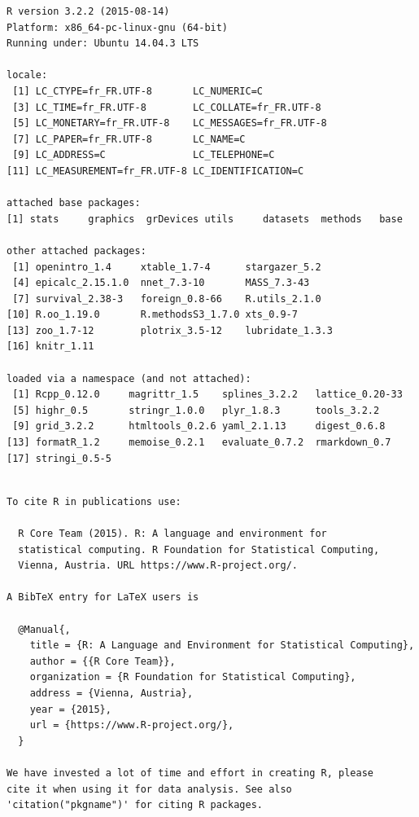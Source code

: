 \documentclass[]{article}
\begin{document}
\begin{verbatim}
R version 3.2.2 (2015-08-14)
Platform: x86_64-pc-linux-gnu (64-bit)
Running under: Ubuntu 14.04.3 LTS

locale:
 [1] LC_CTYPE=fr_FR.UTF-8       LC_NUMERIC=C              
 [3] LC_TIME=fr_FR.UTF-8        LC_COLLATE=fr_FR.UTF-8    
 [5] LC_MONETARY=fr_FR.UTF-8    LC_MESSAGES=fr_FR.UTF-8   
 [7] LC_PAPER=fr_FR.UTF-8       LC_NAME=C                 
 [9] LC_ADDRESS=C               LC_TELEPHONE=C            
[11] LC_MEASUREMENT=fr_FR.UTF-8 LC_IDENTIFICATION=C       

attached base packages:
[1] stats     graphics  grDevices utils     datasets  methods   base     

other attached packages:
 [1] openintro_1.4     xtable_1.7-4      stargazer_5.2    
 [4] epicalc_2.15.1.0  nnet_7.3-10       MASS_7.3-43      
 [7] survival_2.38-3   foreign_0.8-66    R.utils_2.1.0    
[10] R.oo_1.19.0       R.methodsS3_1.7.0 xts_0.9-7        
[13] zoo_1.7-12        plotrix_3.5-12    lubridate_1.3.3  
[16] knitr_1.11       

loaded via a namespace (and not attached):
 [1] Rcpp_0.12.0     magrittr_1.5    splines_3.2.2   lattice_0.20-33
 [5] highr_0.5       stringr_1.0.0   plyr_1.8.3      tools_3.2.2    
 [9] grid_3.2.2      htmltools_0.2.6 yaml_2.1.13     digest_0.6.8   
[13] formatR_1.2     memoise_0.2.1   evaluate_0.7.2  rmarkdown_0.7  
[17] stringi_0.5-5  
\end{verbatim}

\begin{verbatim}

To cite R in publications use:

  R Core Team (2015). R: A language and environment for
  statistical computing. R Foundation for Statistical Computing,
  Vienna, Austria. URL https://www.R-project.org/.

A BibTeX entry for LaTeX users is

  @Manual{,
    title = {R: A Language and Environment for Statistical Computing},
    author = {{R Core Team}},
    organization = {R Foundation for Statistical Computing},
    address = {Vienna, Austria},
    year = {2015},
    url = {https://www.R-project.org/},
  }

We have invested a lot of time and effort in creating R, please
cite it when using it for data analysis. See also
'citation("pkgname")' for citing R packages.
\end{verbatim}
\end{document}
